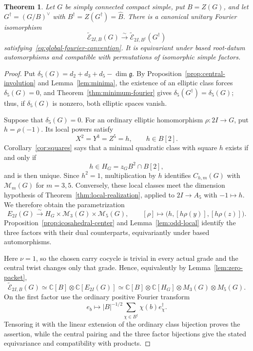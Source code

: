 \documentclass[11pt,a4paper,reqno]{amsart}
\theoremstyle{plain}
\newtheorem{theorem}{Theorem}[section]
\theoremstyle{definition}
\theoremstyle{remark}
\numberwithin{equation}{section}
\newcommand{\CC}{\mathbb C}
\newcommand{\fg}{\mathfrak g}
\newcommand{\cM}{\mathcal M}
\newcommand{\wtE}{\widetilde{\mathcal E}}
\begin{document}
\begin{theorem}\label{thm:icosahedral-fourier}
Let $G$ be simply connected compact simple, put $B=Z(G)$, and let $G^\dagger=(G/B)^\vee$ with $B^\dagger=Z(G^\dagger)=\widehat B$. There is a canonical unitary Fourier isomorphism
\[
\wtE_{2I,B}(G)\xrightarrow{\sim}\wtE_{2I,B^\dagger}(G^\dagger)
\]
satisfying~\eqref{eq:global-fourier-convention}. It is equivariant under based root-datum automorphisms and compatible with permutations of isomorphic simple factors.
\end{theorem}
\begin{proof}
Put $\delta_5(G)=d_2+d_3+d_5-\dim\fg$. By Proposition~\ref{prop:central-involution} and Lemma~\ref{lem:minima}, the existence of an elliptic class forces $\delta_5(G)=0$, and Theorem~\ref{thm:minimum-fourier} gives $\delta_5(G^\dagger)=\delta_5(G)$; thus, if $\delta_5(G)$ is nonzero, both elliptic spaces vanish.

Suppose that $\delta_5(G)=0$. For an ordinary elliptic homomorphism $\rho\colon 2I\to G$, put $h=\rho(-1)$. Its local powers satisfy
\[
X^2=Y^3=Z^5=h,\qquad h\in B[2].
\]
Corollary~\ref{cor:squares} says that a minimal quadratic class with square $h$ exists if and only if
\[
h\in H_G=z_GB^2\cap B[2],
\]
and is then unique. Since $h^2=1$, multiplication by $h$ identifies $C_{h,m}(G)$ with $\cM_m(G)$ for $m=3,5$. Conversely, these local classes meet the dimension hypothesis of Theorem~\ref{thm:local-realization}, applied to $2I\to A_5$ with $-1\mapsto h$. We therefore obtain the parametrization
\begin{equation}\label{eq:icosahedral-ordinary-model}
E_{2I}(G)\xrightarrow{\sim}H_G\times\cM_3(G)\times\cM_5(G),\qquad [\rho]\longmapsto\bigl(h,[h\rho(y)],[h\rho(z)]\bigr).
\end{equation}
Proposition~\ref{prop:icosahedral-center} and Lemma~\ref{lem:odd-local} identify the three factors with their dual counterparts, equivariantly under based automorphisms.

Here $\nu=1$, so the chosen carry cocycle is trivial in every actual grade and the central twist changes only that grade. Hence, equivalently by Lemma~\ref{lem:zero-packet},
\begin{equation}\label{eq:icosahedral-full-center}
\wtE_{2I,B}(G)\simeq\CC[B]\otimes\CC[E_{2I}(G)]\simeq\CC[B]\otimes\CC[H_G]\otimes M_3(G)\otimes M_5(G).
\end{equation}
On the first factor use the ordinary positive Fourier transform
\[
e_b\longmapsto |B|^{-1/2}\sum_{\chi\in B^\dagger}\chi(b)e_\chi^\dagger.
\]
Tensoring it with the linear extension of the ordinary class bijection proves the assertion, while the central pairing and the three factor bijections give the stated equivariance and compatibility with products.
\end{proof}
\end{document}
